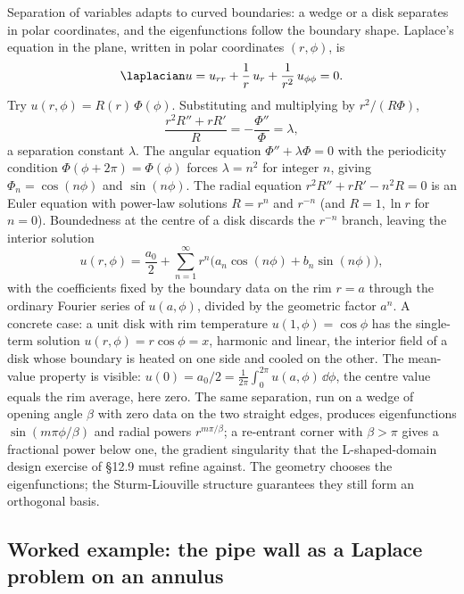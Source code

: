 Separation of variables adapts to curved boundaries: a wedge or a
disk separates in polar coordinates, and the eigenfunctions follow
the boundary shape.
Laplace's equation in the plane, written in polar coordinates
$(r, \phi)$, is
\[
\laplacian u = u_{rr} + \frac{1}{r}\, u_{r} + \frac{1}{r^{2}}\, u_{\phi\phi} = 0.
\]
Try $u(r, \phi) = R(r)\, \Phi(\phi)$. Substituting and multiplying
by $r^{2}/(R\Phi)$,
\[
\frac{r^{2} R'' + r R'}{R} = -\frac{\Phi''}{\Phi} = \lambda,
\]
a separation constant $\lambda$. The angular equation $\Phi'' +
\lambda\Phi = 0$ with the periodicity condition $\Phi(\phi + 2\pi)
= \Phi(\phi)$ forces $\lambda = n^{2}$ for integer $n$, giving
$\Phi_{n} = \cos(n\phi)$ and $\sin(n\phi)$. The radial equation
$r^{2} R'' + r R' - n^{2} R = 0$ is an Euler equation with power-law
solutions $R = r^{n}$ and $r^{-n}$ (and $R = 1, \ln r$ for $n = 0$).
Boundedness at the centre of a disk discards the $r^{-n}$ branch,
leaving the interior solution
\[
u(r, \phi) = \frac{a_{0}}{2} + \sum_{n = 1}^{\infty} r^{n}\bigl(a_{n}\cos(n\phi) + b_{n}\sin(n\phi)\bigr),
\]
with the coefficients fixed by the boundary data on the rim $r = a$
through the ordinary Fourier series of $u(a, \phi)$, divided by the
geometric factor $a^{n}$. A concrete case: a unit disk with rim
temperature $u(1, \phi) = \cos\phi$ has the single-term solution
$u(r, \phi) = r\cos\phi = x$, harmonic and linear, the interior
field of a disk whose boundary is heated on one side and cooled on
the other. The mean-value property is visible: $u(0) = a_{0}/2 =
\tfrac{1}{2\pi}\int_{0}^{2\pi} u(a, \phi)\,\dd\phi$, the centre
value equals the rim average, here zero. The same separation, run on
a wedge of opening angle $\beta$ with zero data on the two straight
edges, produces eigenfunctions $\sin(m\pi\phi/\beta)$ and radial
powers $r^{m\pi/\beta}$; a re-entrant corner with $\beta > \pi$
gives a fractional power below one, the gradient singularity that
the L-shaped-domain design exercise of §12.9 must refine against.
The geometry chooses the eigenfunctions; the Sturm-Liouville
structure guarantees they still form an orthogonal basis.

\subsection{Worked example: the pipe wall as a Laplace problem on an annulus}

